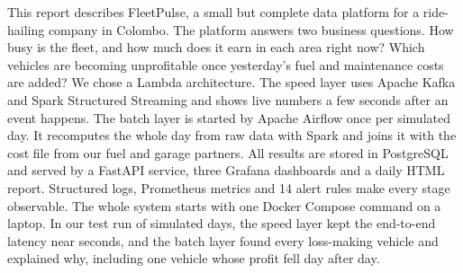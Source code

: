 This report describes FleetPulse, a small but complete data platform for a ride-hailing company in
Colombo. The platform answers two business questions. How busy is the fleet, and how much does it earn
in each area right now? Which vehicles are becoming unprofitable once yesterday's fuel and maintenance
costs are added? We chose a Lambda architecture. The speed layer uses Apache Kafka and Spark Structured
Streaming and shows live numbers a few seconds after an event happens. The batch layer is started by
Apache Airflow once per simulated day. It recomputes the whole day from raw data with Spark and joins it
with the cost file from our fuel and garage partners. All results are stored in PostgreSQL and served by a
FastAPI service, three Grafana dashboards and a daily HTML report. Structured logs, Prometheus metrics and
14 alert rules make every stage observable. The whole system starts with one Docker Compose command on a
laptop. In our test run of \NumDays{} simulated days, the speed layer kept the end-to-end latency near
\LatencyAvg{} seconds, and the batch layer found every loss-making vehicle and explained why, including one
vehicle whose profit fell day after day.
